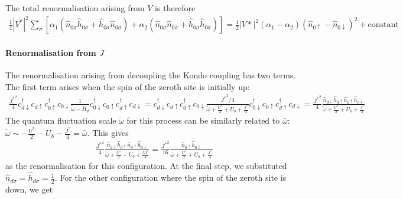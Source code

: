 \documentclass{report}
\numberwithin{equation}{section}
\begin{document}
The total renormalisation arising from \(V\) is therefore
\begin{equation}\begin{aligned}
	\frac{1}{4}|V^*|^2 \sum_\sigma \left[\alpha_1 \left( \hat n_{0\sigma}\hat h_{0\bar\sigma} + \hat h_{0\sigma}\hat n_{0\bar\sigma}\right) + \alpha_2 \left( \hat n_{0\sigma}\hat n_{0\bar\sigma} + \hat h_{0\sigma}\hat h_{0\bar\sigma}\right)\right] = \frac{1}{2}|V*|^2 \left(\alpha_1 - \alpha_2\right) \left(\hat n_{0 \uparrow} - \hat n_{0 \downarrow}\right)^2 + \text{constant}
\end{aligned}\end{equation}

\paragraph{Renormalisation from \(J\)}
The renormalisation arising from decoupling the Kondo coupling has two terms. The first term arises when the spin of the zeroth site is initially up:
\begin{equation}\begin{aligned}
	\frac{{J^*}^2}{4}c^\dagger_{d \downarrow}c_{d \uparrow} c^\dagger_{0 \uparrow}c_{0 \downarrow} \frac{1}{\tilde \omega - H_d} c^\dagger_{0 \downarrow}c_{0 \uparrow} c^\dagger_{d \uparrow}c_{d \downarrow} = c^\dagger_{d \downarrow}c_{d \uparrow} c^\dagger_{0 \uparrow}c_{0 \downarrow} \frac{{J^*}^2/4}{\tilde \omega + \frac{U^*}{2} + U_b + \frac{J^*}{4}} c^\dagger_{0 \downarrow}c_{0 \uparrow} c^\dagger_{d \uparrow}c_{d \downarrow} = \frac{{J^*}^2}{4}\frac{\hat n_{d \downarrow} \hat h_{d \uparrow} \hat n_{ 0 \uparrow} \hat h_{0 \downarrow}}{\tilde \omega + \frac{U^*}{2} + U_b + \frac{J^*}{4}} 
\end{aligned}\end{equation}
The quantum fluctuation scale \(\tilde \omega\) for this process can be similarly related to \(\bar\omega\): \(\tilde\omega \sim -\frac{U^*}{2} - U_b - \frac{J^*}{4} = \bar\omega\). This gives
\begin{equation}\begin{aligned}
	\frac{{J^*}^2}{4}\frac{\hat n_{d \downarrow} \hat h_{d \uparrow} \hat n_{ 0 \uparrow} \hat h_{0 \downarrow}}{\bar\omega + \frac{U^*}{2} + U_b + \frac{3J^*}{4}} = \frac{{J^*}^2}{16}\frac{\hat n_{ 0 \uparrow} \hat h_{0 \downarrow}}{\bar\omega + \frac{U^*}{2} + U_b + \frac{J^*}{4}}
\end{aligned}\end{equation}
as the renormalisation for this configuration. At the final step, we substituted \(\hat n_{d\sigma} = \hat h_{d\sigma} = \frac{1}{2}\). For the other configuration where the spin of the zeroth site is down, we get
\end{document}
